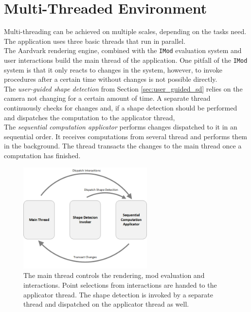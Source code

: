 \section{Multi-Threaded Environment}
\label {sec:multithreading}

Multi-threading can be achieved on multiple scales, depending on the tasks need. The application uses three basic threads that run in parallel. 
\\
The Aardvark rendering engine, combined with the \verb|IMod| evaluation system and user interactions build the main thread of the application. One pitfall of the \verb|IMod| system is that it only reacts to changes in the system, however, to invoke procedures after a certain time without changes is not possible directly. 
\\


The \textit{user-guided shape detection} from Section \ref{sec:user_guided_sd} relies on the camera not changing for a certain amount of time. 
A separate thread continuously checks for changes and, if a shape detection should be performed and dispatches the computation to the applicator thread, 
\\
The \textit{sequential computation applicator} performs changes dispatched to it in an sequential order. It receives computations from several thread and performs them in the background. The thread transacts the changes to the main thread once a computation has finished. 

\begin{figure}
    \centering
    \includegraphics[width=0.6\textwidth]{Implementation/multiThreading.png}
    \caption{The main thread controls the rendering, mod evaluation and interactions. Point selections from interactions are handed to the applicator thread. The shape detection is invoked by a separate thread and dispatched on the applicator thread as well.  }
    \label{fig:multiThreading}
\end{figure}

